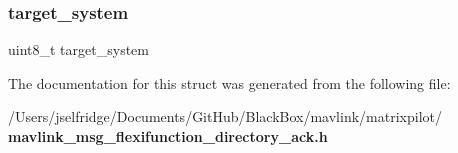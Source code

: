 \subsubsection{target\+\_\+system}
{\footnotesize\ttfamily uint8\+\_\+t target\+\_\+system}



The documentation for this struct was generated from the following file\+:\begin{DoxyCompactItemize}
\item 
/\+Users/jselfridge/\+Documents/\+Git\+Hub/\+Black\+Box/mavlink/matrixpilot/\textbf{ mavlink\+\_\+msg\+\_\+flexifunction\+\_\+directory\+\_\+ack.\+h}\end{DoxyCompactItemize}
